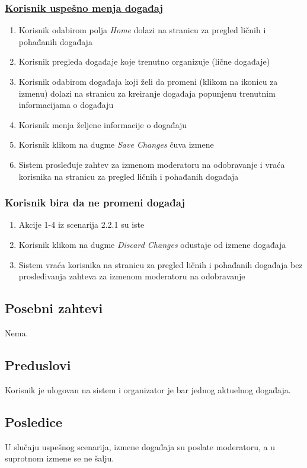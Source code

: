 \documentclass[11pt,a4paper]{article}
\begin{document}
\subsubsection{\underline{Korisnik uspešno menja događaj}}
\begin{enumerate}
    \item Korisnik odabirom polja \textit{Home} dolazi na stranicu za pregled ličnih i pohađanih događaja
    \item Korisnik pregleda događaje koje trenutno organizuje (lične događaje)
    \item Korisnik odabirom događaja koji želi da promeni (klikom na ikonicu za izmenu) dolazi na stranicu za kreiranje događaja popunjenu trenutnim informacijama o događaju
    \item Korisnik menja željene informacije o događaju
    \item Korisnik klikom na dugme \textit{Save Changes} čuva izmene
    \item Sistem prosleđuje zahtev za izmenom moderatoru na odobravanje i vraća korisnika na stranicu za pregled ličnih i pohađanih događaja
\end{enumerate}

\subsubsection{Korisnik bira da ne promeni događaj}
\begin{enumerate}
    \item Akcije 1-4 iz scenarija 2.2.1 su iste
    \item Korisnik klikom na dugme \textit{Discard Changes} odustaje od izmene događaja
    \item Sistem vraća korisnika na stranicu za pregled ličnih i pohađanih događaja bez prosleđivanja zahteva za izmenom moderatoru na odobravanje
\end{enumerate}

\subsection{Posebni zahtevi}
Nema.
\subsection{Preduslovi}
Korisnik je ulogovan na sistem i organizator je bar jednog aktuelnog događaja.
\subsection{Posledice}
U slučaju uspešnog scenarija, izmene događaja su poslate moderatoru, a u suprotnom izmene se ne šalju.
\end{document}
